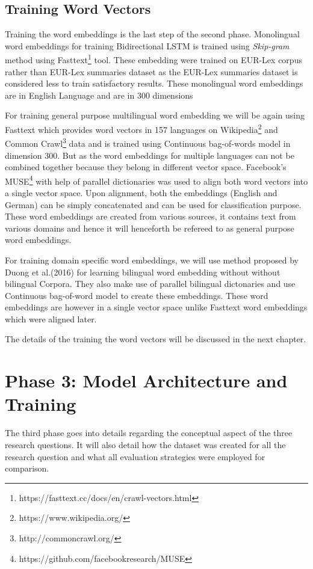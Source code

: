 \subsection*{Training Word Vectors}

Training the word embeddings is the last step of the second phase. Monolingual word embeddings for training Bidirectional LSTM is trained using \textit{Skip-gram} method using Fasttext\footnote{https://fasttext.cc/docs/en/crawl-vectors.html}\cite{graves2009novel} tool. These embedding were trained on EUR-Lex corpus rather than EUR-Lex summaries dataset as the EUR-Lex summaries dataset is considered less to train satisfactory results. These monolingual word embeddings are in English Language and are in 300 dimensions

For training general purpose multilingual word embedding we will be again using Fasttext which provides word vectors in 157 languages on Wikipedia\footnote{https://www.wikipedia.org/} and Common Crawl\footnote{http://commoncrawl.org/} data and is trained using Continuous bag-of-words model in dimension 300. But as the word embeddings for multiple languages can not be combined together because they belong in different vector space. Facebook's MUSE\footnote{https://github.com/facebookresearch/MUSE} \cite{conneau2017word} with help of parallel dictionaries was used to align both word vectors into a single vector space. Upon alignment, both the embeddings (English and German) can be simply concatenated and can be used for classification purpose. These word embeddings are created from various sources, it contains text from various domains and hence it will henceforth be refereed to as general purpose word embeddings.

For training domain specific word embeddings, we will use method proposed by Duong et al.(2016)\cite{duong-EtAl:2016:EMNLP} for learning bilingual word embedding without without bilingual Corpora. They also make use of parallel bilingual dictonaries and use Continuous bag-of-word model to create these embeddings. These word embeddings are however in a single vector space unlike Fasttext word embeddings which were aligned later.

The details of the training the word vectors will be discussed in the next chapter.

\section{Phase 3: Model Architecture and Training}\label{sec:conceptRQ}
The third phase goes into details regarding the conceptual aspect of the three research questions. It will also detail how the dataset was created for all the research question and what all evaluation strategies were employed for comparison. 




